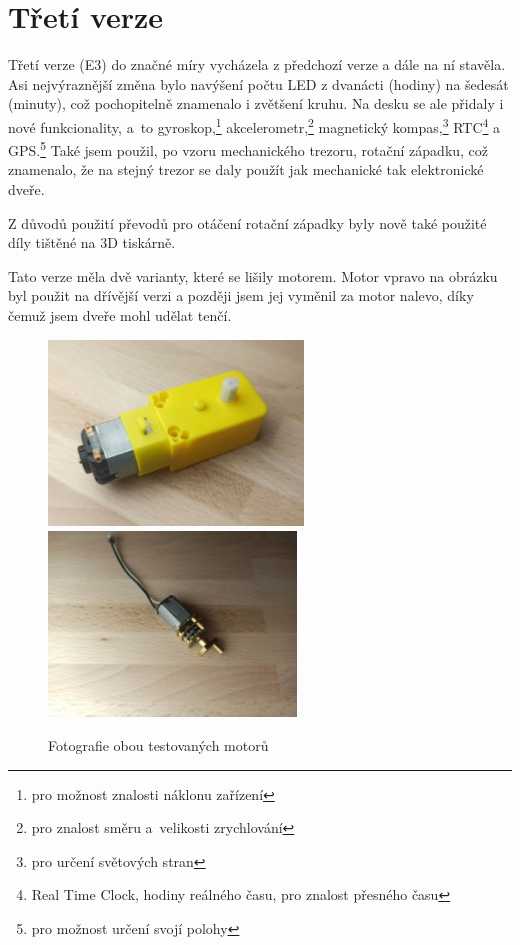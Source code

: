 \section{Třetí verze}
\label{E3-vyvoj}

Třetí verze (E3) do značné míry vycházela z předchozí verze a dále na ní stavěla. Asi nejvýraznější změna bylo navýšení počtu 
LED z dvanácti (hodiny) na šedesát (minuty), což pochopitelně znamenalo i zvětšení kruhu. Na desku se ale přidaly i nové funkcionality,
a~to gyroskop,\footnote{pro možnost znalosti náklonu zařízení} akcelerometr,\footnote{pro znalost směru a~velikosti zrychlování} magnetický kompas,\footnote{pro určení světových
stran} RTC\footnote{Real Time Clock, hodiny reálného času, pro znalost přesného času} a GPS.\footnote{pro možnost určení svojí polohy}
Také jsem použil, po vzoru mechanického trezoru, rotační západku, což znamenalo, že na stejný trezor se daly použít jak mechanické tak 
elektronické dveře.

Z důvodů použití převodů pro otáčení rotační západky byly nově také použité díly tištěné na 3D tiskárně. 

Tato verze měla dvě varianty, které se lišily motorem.
Motor vpravo na obrázku  byl použit na dřívější verzi a později jsem jej vyměnil za motor nalevo, díky čemuž jsem dveře mohl udělat tenčí. %
\begin{figure}[htbp]
    \centering
    \includegraphics[height=140pt]{kapitoly/obrazky/E3/motory/zluty_motor.jpg}
    \includegraphics[height=140pt]{kapitoly/obrazky/E3/motory/hodinovyStrojek.jpg}
    \caption{Fotografie obou testovaných motorů} 
    \label{fig:E3-motory}
\end{figure}

\newpage